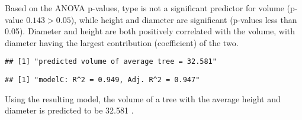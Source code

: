 \documentclass[
  11pt,
]{article}
\newenvironment{Shaded}{\begin{snugshade}}{\end{snugshade}}
\newcommand{\AttributeTok}[1]{\textcolor[rgb]{0.77,0.63,0.00}{#1}}
\newcommand{\CommentTok}[1]{\textcolor[rgb]{0.56,0.35,0.01}{\textit{#1}}}
\newcommand{\FunctionTok}[1]{\textcolor[rgb]{0.00,0.00,0.00}{#1}}
\newcommand{\NormalTok}[1]{#1}
\newcommand{\OtherTok}[1]{\textcolor[rgb]{0.56,0.35,0.01}{#1}}
\newcommand{\SpecialCharTok}[1]{\textcolor[rgb]{0.00,0.00,0.00}{#1}}
\newcommand{\StringTok}[1]{\textcolor[rgb]{0.31,0.60,0.02}{#1}}
\begin{document}
Based on the ANOVA p-values, type is not a significant predictor for
volume (p-value \(0.143 > 0.05\)), while height and diameter are
significant (p-values less than 0.05). Diameter and height are both
positively correlated with the volume, with diameter having the largest
contribution (coefficient) of the two.

\begin{Shaded}
\end{Shaded}

\begin{verbatim}
## [1] "predicted volume of average tree = 32.581"
\end{verbatim}

\begin{Shaded}
\end{Shaded}

\begin{verbatim}
## [1] "modelC: R^2 = 0.949, Adj. R^2 = 0.947"
\end{verbatim}

Using the resulting model, the volume of a tree with the average height
and diameter is predicted to be 32.581 .
\end{document}
